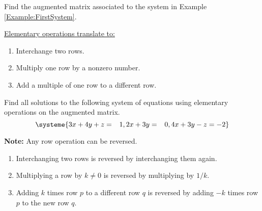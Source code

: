 \documentclass[20pt,a4paper]{extarticle}
\newcounter{example}[section]
\begin{document}
\begin{example}
Find the augmented matrix associated to the system in Example \ref{Example:FirstSystem}.
\end{example}

\begin{solution}

\end{solution}

\vfill 

\underline{Elementary operations translate to:}
\begin{enumerate}[label=\textbf{\Roman*.}]
\item Interchange two rows.
\item Multiply one row by a nonzero number.
\item Add a multiple of one row to a different row.
\end{enumerate}

\begin{comment}\begin{proof}
Assume $x_1 = s_1$, $\ldots$, $x_n = s_n$ is a solution to the system and a type III operation was performed to transform $E_1 = b_1$ into $E_1 + k E_2 = b_1 + k b_2$. Since $s_1, s_2$, $\ldots$, $s_n$ solve the equations $E_1 = b_1$ and $E_2 = b_2$, it must also solve $E_1 + k E_2 = b_1 + kb_2$.

Assume now that $x_1 = s_1$, $\ldots$, $x_n = s_n$ is a solution to the system with $E_1 = b_1$ replaced by $E_1 + k E_2 = b_1 + k b_2$. Then, replacing $E_1 + kE_2 = b_1 + kb_2$ by $(E_1 + kE_2) - k E_2 = (b_1 + kb_2) - k b_2$, we get $E_1 = b_1$. From the previous paragraph, $s_1, s_2$, $\ldots$, $s_n$ is a solution to $E_1 = b_1$. \hfill $\square$
\end{proof}
\end{comment}

\newpage

\begin{example}
Find all solutions to the following system of equations using elementary operations on the augmented matrix.
	\[
		\systeme{3x + 4y + z = \phantom{-}1, 2x + 3y = \phantom{-} 0, 4x + 3y - z = -2}
	\]
\end{example}

\begin{solution}

\end{solution}

\newpage 

\phantom{2}

\vfill 


\textbf{Note:} Any row operation can be reversed.
	\begin{enumerate}[label=\textbf{\Roman*.}]
		\item Interchanging two rows is reversed by interchanging them again.
		\item Multiplying a row by $k \neq 0$ is reversed by multiplying by $1/k$.
		\item Adding $k$ times row $p$ to a different row $q$ is reversed by adding $-k$ times row $p$ to the new row $q$. 
	\end{enumerate}
\end{document}
